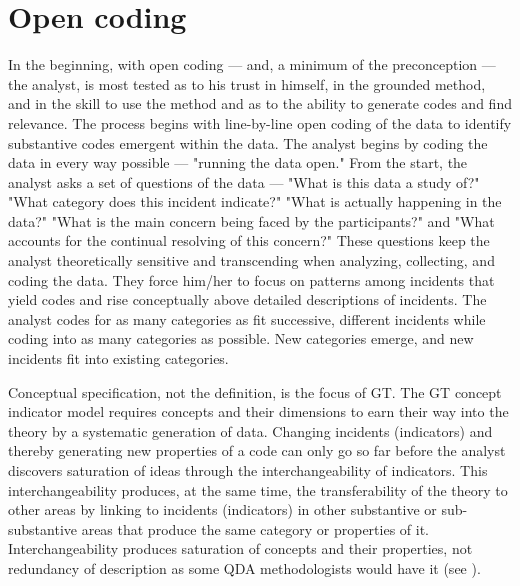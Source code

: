\section*{Open coding}

In the beginning, with open coding --- and, a minimum of the preconception --- the analyst, is most tested as to his trust in himself, in the grounded method, and in the skill to use the method and as to the ability to generate codes and find relevance. 
The process begins with line-by-line open coding of the data to
identify substantive codes emergent within the data. 
The analyst begins by coding the data in every way possible --- "running the data open."
From the start, the analyst asks a set of questions of the data --- "What is this data a study of?"
"What category does this incident indicate?"
"What is actually happening in the data?" 
"What is the main concern being faced by the participants?" 
and 
"What accounts for the continual resolving of this concern?" 
These questions keep the analyst theoretically sensitive and transcending when analyzing, collecting, and coding the data. 
They force him/her to focus on patterns among incidents that yield codes and rise conceptually above detailed descriptions of incidents. 
The analyst codes for as many categories as fit successive, different incidents while coding into as many categories as possible. 
New categories emerge, and new incidents fit into existing categories.












\vspace{100pt}

Conceptual specification, not the definition, is the focus of GT. 
The GT concept indicator model requires concepts and their dimensions to earn their way into the theory by a systematic generation of data. 
Changing incidents (indicators) and thereby generating new properties of a code can only go so far before the analyst discovers saturation of ideas through the interchangeability of indicators.
This interchangeability produces, at the same time, the transferability of the theory to other areas by linking to incidents (indicators) in other substantive or sub-substantive areas that produce the same category or properties of it.
Interchangeability produces saturation of concepts and their properties, not redundancy of description as some QDA methodologists would have it 
(see \citep{article.morse95}).
\vspace{100pt}

